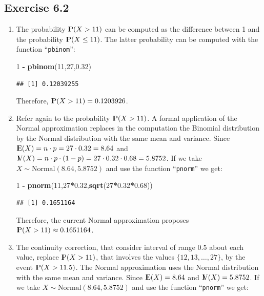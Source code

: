 \documentclass[]{krantz}
\makeatletter
\newenvironment{Shaded}{\begin{snugshade}}{\end{snugshade}}
\newcommand{\DecValTok}[1]{\textcolor[rgb]{0.00,0.00,0.81}{#1}}
\newcommand{\FloatTok}[1]{\textcolor[rgb]{0.00,0.00,0.81}{#1}}
\newcommand{\KeywordTok}[1]{\textcolor[rgb]{0.13,0.29,0.53}{\textbf{#1}}}
\newcommand{\NormalTok}[1]{#1}
\newcommand{\OperatorTok}[1]{\textcolor[rgb]{0.81,0.36,0.00}{\textbf{#1}}}
\newcommand{\StringTok}[1]{\textcolor[rgb]{0.31,0.60,0.02}{#1}}
\newcommand{\Expec}{{\rm I\kern-.3em E}}
\newcommand{\Prob}{{\rm I\kern-.3em P}}
\newcommand{\Var}{{\rm I\kern-.3em V}}
\newenvironment{kframe}{%
\medskip{}
\setlength{\fboxsep}{.8em}
 \def\at@end@of@kframe{}%
 \ifinner\ifhmode%
  \def\at@end@of@kframe{\end{minipage}}%
  \begin{minipage}{\columnwidth}%
 \fi\fi%
 \def\FrameCommand##1{\hskip\@totalleftmargin \hskip-\fboxsep
 \colorbox{shadecolor}{##1}\hskip-\fboxsep
     \hskip-\linewidth \hskip-\@totalleftmargin \hskip\columnwidth}%
 \MakeFramed {\advance\hsize-\width
   \@totalleftmargin\z@ \linewidth\hsize
   \@setminipage}}%
 {\par\unskip\endMakeFramed%
 \at@end@of@kframe}
\renewenvironment{Shaded}{\begin{kframe}}{\end{kframe}}
\theoremstyle{definition}
\theoremstyle{definition}
\theoremstyle{definition}
\theoremstyle{remark}
\makeatother
\begin{document}
\hypertarget{exercise-6.2}{%
\subsection*{Exercise 6.2}\label{exercise-6.2}}


\begin{enumerate}
\def\labelenumi{\arabic{enumi}.}
\item
  The probability \(\Prob(X > 11)\) can be
  computed as the difference between 1 and the probability
  \(\Prob(X \leq 11)\). The latter probability can be computed with the
  function ``\texttt{pbinom}'':

\begin{Shaded}
\begin{Highlighting}[]
\DecValTok{1} \OperatorTok{-}\StringTok{ }\KeywordTok{pbinom}\NormalTok{(}\DecValTok{11}\NormalTok{,}\DecValTok{27}\NormalTok{,}\FloatTok{0.32}\NormalTok{)}
\end{Highlighting}
\end{Shaded}

\begin{verbatim}
## [1] 0.12039255
\end{verbatim}

  Therefore, \(\Prob(X > 11) = 0.1203926\).
\item
  Refer again to the probability
  \(\Prob(X > 11)\). A formal application of the Normal approximation
  replaces in the computation the Binomial distribution by the Normal
  distribution with the same mean and variance. Since
  \(\Expec(X) = n \cdot p = 27 \cdot 0.32 = 8.64\) and
  \(\Var(X) = n \cdot p \cdot (1-p) = 27 \cdot 0.32 \cdot 0.68 = 5.8752\).
  If we take \(X \sim \mbox{Normal}(8.64,5.8752)\) and use the function
  ``\texttt{pnorm}'' we get:

\begin{Shaded}
\begin{Highlighting}[]
\DecValTok{1} \OperatorTok{-}\StringTok{ }\KeywordTok{pnorm}\NormalTok{(}\DecValTok{11}\NormalTok{,}\DecValTok{27}\OperatorTok{*}\FloatTok{0.32}\NormalTok{,}\KeywordTok{sqrt}\NormalTok{(}\DecValTok{27}\OperatorTok{*}\FloatTok{0.32}\OperatorTok{*}\FloatTok{0.68}\NormalTok{))}
\end{Highlighting}
\end{Shaded}

\begin{verbatim}
## [1] 0.1651164
\end{verbatim}

  Therefore, the current Normal approximation proposes
  \(\Prob(X > 11) \approx 0.1651164\).
\item
  The continuity correction, that
  consider interval of range 0.5 about each value, replace
  \(\Prob(X > 11)\), that involves the values \(\{12, 13, \ldots, 27\}\), by
  the event \(\Prob(X > 11.5)\). The Normal approximation uses the Normal
  distribution with the same mean and variance. Since \(\Expec(X) = 8.64\)
  and \(\Var(X) = 5.8752\). If we take \(X \sim \mbox{Normal}(8.64,5.8752)\)
  and use the function ``\texttt{pnorm}'' we get:


\end{enumerate}
\end{document}
